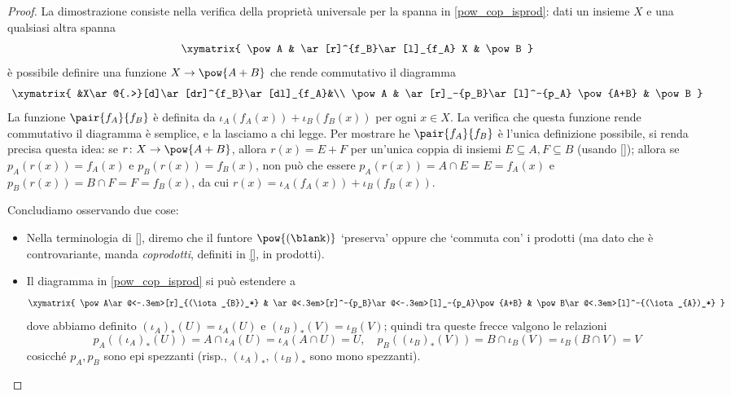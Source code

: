 \begin{proof}
	La dimostrazione consiste nella verifica della proprietà universale per la spanna in \eqref{pow_cop_isprod}: dati un insieme \(X\) e una qualsiasi altra spanna
	\[\xymatrix{
			\pow A & \ar[r]^{f_B}\ar[l]_{f_A} X & \pow B
		}\]
	è possibile definire una funzione \(X \to \pow{A+B}\)	che rende commutativo il diagramma
	\[\xymatrix{
		&X\ar@{.>}[d]\ar[dr]^{f_B}\ar[dl]_{f_A}&\\
		\pow A & \ar[r]_-{p_B}\ar[l]^-{p_A} \pow{A+B} & \pow B
		}\]
	La funzione \(\pair{f_A}{f_B}\) è definita da \(\iota_A(f_A(x)) + \iota_B(f_B(x))\) per ogni \(x\in X\). La verifica che questa funzione rende commutativo il diagramma è semplice, e la lasciamo a chi legge. Per mostrare he \(\pair{f_A}{f_B}\) è l'unica definizione possibile, si renda precisa questa idea: se \(r \colon X \to \pow{A+B}\), allora \(r(x) = E+F\) per un'unica coppia di insiemi \(E\subseteq A,F\subseteq B\) (usando \ref{}); allora se \(p_A(r(x))=	f_A(x)\) e \(p_B(r(x)) = f_B(x)\), non può che essere \(p_A(r(x)) = A\cap E=E=f_A(x)\) e \(p_B(r(x)) = B\cap F=F=f_B(x)\), da cui \(r(x) = \iota_A(f_A(x)) + \iota_B(f_B(x))\).

	Concludiamo osservando due cose:
	\begin{itemize}
		\item Nella terminologia di \ref{}, diremo che il funtore \(\pow{(\blank)}\) `preserva' oppure che `commuta con' i prodotti (ma dato che è controvariante, manda \emph{coprodotti}, definiti in \ref{}, in prodotti).
		\item Il diagramma in \eqref{pow_cop_isprod} si può estendere a
		      \[\xymatrix{
			      \pow A\ar@<-.3em>[r]_{(\iota_{B})_*} & \ar@<.3em>[r]^-{p_B}\ar@<-.3em>[l]_-{p_A}\pow{A+B} & \pow B\ar@<.3em>[l]^-{(\iota_{A})_*}
			      }\]
		      dove abbiamo definito \((\iota_{A})_* (U) = \iota_A(U)\) e \((\iota_{B})_* (V) = \iota_B(V)\); quindi tra queste frecce valgono le relazioni
		      \[p_A((\iota_{A})_* (U)) = A\cap\iota_A(U) = \iota_A(A\cap U)=U,\quad
			      p_B((\iota_{B})_* (V)) = B\cap\iota_B(V) = \iota_B(B\cap V)=V\]
		      cosicché \(p_A,p_B\) sono epi spezzanti (risp., \((\iota_A)_*, (\iota_B)_*\) sono mono spezzanti). \qedhere
	\end{itemize}
\end{proof}
